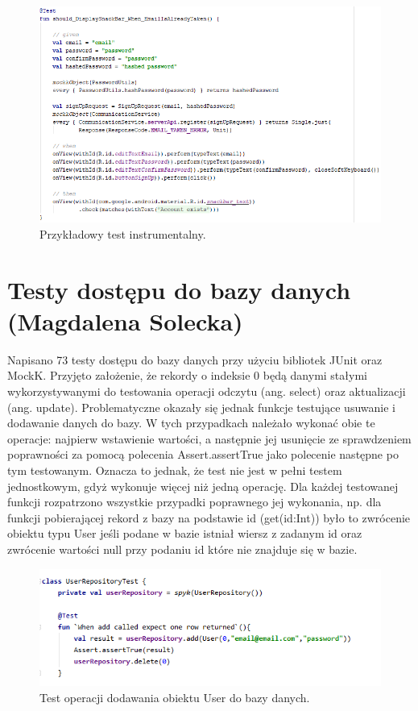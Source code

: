 \documentclass[10pt,twoside,a4paper]{report}
\begin{document}
\begin{figure}[h]
\centering
\includegraphics[width=\linewidth]{instrumentationTest}
\caption{Przykładowy test instrumentalny.}
\label{fig:instrumentationTest}
\end{figure}
\FloatBarrier

\section{Testy dostępu do bazy danych (Magdalena Solecka)}
\par Napisano 73 testy dostępu do bazy danych przy użyciu bibliotek JUnit\cite{JUnit} oraz MockK\cite{MockK}. Przyjęto założenie, że rekordy o indeksie 0 będą danymi stałymi wykorzystywanymi do testowania operacji odczytu (ang. select) oraz aktualizacji (ang. update). Problematyczne okazały się jednak funkcje testujące usuwanie i dodawanie danych do bazy. W tych przypadkach należało wykonać obie te operacje: najpierw wstawienie wartości, a następnie jej usunięcie ze sprawdzeniem poprawności za pomocą polecenia Assert.assertTrue jako polecenie następne po tym testowanym. Oznacza to jednak, że test nie jest w pełni testem jednostkowym, gdyż wykonuje więcej niż jedną operację. Dla każdej testowanej funkcji rozpatrzono wszystkie przypadki poprawnego jej wykonania, np. dla funkcji pobierającej rekord z bazy na podstawie id (get(id:Int)) było to zwrócenie obiektu typu User jeśli podane w bazie istniał wiersz z zadanym id oraz zwrócenie wartości null przy podaniu id które nie znajduje się w bazie. 

\begin{figure}[h]
\centering
\includegraphics[width=\linewidth]{dbTests}
\caption{Test operacji dodawania obiektu User do bazy danych.}
\label{fig:dbTests}
\end{figure}
\FloatBarrier
\end{document}
